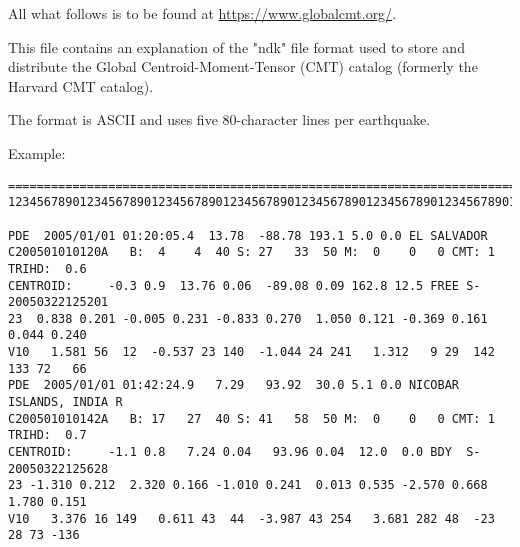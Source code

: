 
All what follows is to be found at \url{https://www.globalcmt.org/}.

This file contains an explanation of the "ndk" file format used to store
and distribute the Global Centroid-Moment-Tensor (CMT) catalog
(formerly the Harvard CMT catalog).

The format is ASCII and uses five 80-character lines per earthquake. 

Example:
\begin{verbatim}
================================================================================
12345678901234567890123456789012345678901234567890123456789012345678901234567890

PDE  2005/01/01 01:20:05.4  13.78  -88.78 193.1 5.0 0.0 EL SALVADOR             
C200501010120A   B:  4    4  40 S: 27   33  50 M:  0    0   0 CMT: 1 TRIHD:  0.6
CENTROID:     -0.3 0.9  13.76 0.06  -89.08 0.09 162.8 12.5 FREE S-20050322125201
23  0.838 0.201 -0.005 0.231 -0.833 0.270  1.050 0.121 -0.369 0.161  0.044 0.240
V10   1.581 56  12  -0.537 23 140  -1.044 24 241   1.312   9 29  142 133 72   66
PDE  2005/01/01 01:42:24.9   7.29   93.92  30.0 5.1 0.0 NICOBAR ISLANDS, INDIA R
C200501010142A   B: 17   27  40 S: 41   58  50 M:  0    0   0 CMT: 1 TRIHD:  0.7
CENTROID:     -1.1 0.8   7.24 0.04   93.96 0.04  12.0  0.0 BDY  S-20050322125628
23 -1.310 0.212  2.320 0.166 -1.010 0.241  0.013 0.535 -2.570 0.668  1.780 0.151
V10   3.376 16 149   0.611 43  44  -3.987 43 254   3.681 282 48  -23  28 73 -136
\end{verbatim}

